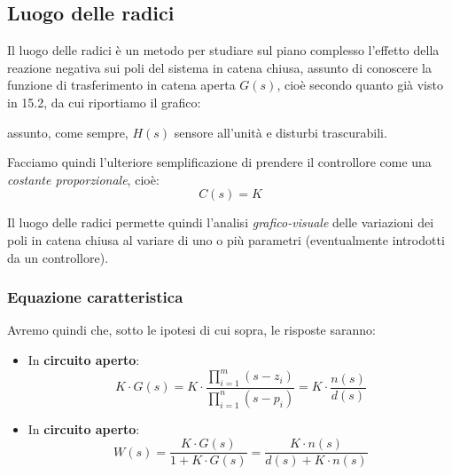 \documentclass[a4paper,11pt]{article}
\begin{document}
\subsection{Luogo delle radici}
Il luogo delle radici è un metodo per studiare sul piano complesso l'effetto della reazione negativa sui poli del sistema in catena chiusa, assunto di conoscere la funzione di trasferimento in catena aperta $G(s)$, cioè secondo quanto già visto in 15.2, da cui riportiamo il grafico:
\begin{center}
\end{center}
assunto, come sempre, $H(s)$ sensore all'unità e disturbi trascurabili.

Facciamo quindi l'ulteriore semplificazione di prendere il controllore come una \textit{costante proporzionale}, cioè:
$$
C(s) = K
$$

Il luogo delle radici permette quindi l'analisi \textit{grafico-visuale} delle variazioni dei poli in catena chiusa al variare di uno o più parametri (eventualmente introdotti da un controllore).

\subsubsection{Equazione caratteristica}
Avremo quindi che, sotto le ipotesi di cui sopra, le risposte saranno:
\begin{itemize}
	\item In \textbf{circuito aperto}:
$$
K \cdot G(s) = K \cdot \frac{\prod_{i = 1}^m (s - z_i)}{\prod_{i = 1}^n (s - p_i)} = K \cdot \frac{n(s)}{d(s)}
$$
	\item In \textbf{circuito aperto}:
$$
W(s) = \frac{K \cdot G(s)}{1 + K \cdot G(s)} = \frac{K \cdot n(s)}{d(s) + K \cdot n(s)}
$$
\end{itemize}
\end{document}
